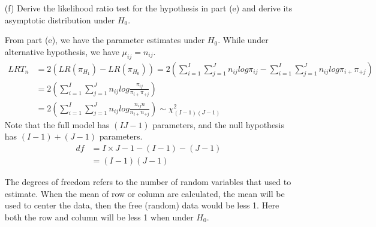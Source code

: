 \begin{itemize}
\item[(f)] Derive the likelihood ratio test for the hypothesis in part (e) and derive its asymptotic distribution under $H_0$.

From part (e), we have the parameter estimates under $H_0$. While under alternative hypothesis, we have $\mu_{ij} = n_{ij}$. 
\begin{align*}
	LRT_n &= 2(LR(\pi_{H_1}) - LR(\pi_{H_0})) =2\left( \sum_{i=1}^I \sum_{j=1}^J n_{ij} log \pi_{ij} - \sum_{i=1}^I \sum_{j=1}^J n_{ij} log \pi_{i+} \pi_{+j} \right)\\
	&= 2\left( \sum_{i=1}^I \sum_{j=1}^J n_{ij} log \frac{\pi_{ij}}{\pi_{i+} \pi_{+j} }   \right)\\
	&= 2\left( \sum_{i=1}^I \sum_{j=1}^J n_{ij} log \frac{n_{ij} n}{n_{i+} n_{+j} }   \right) \sim \chi^2_{(I-1)(J-1)} 
\end{align*}
Note that the full model has $(IJ-1)$ parameters, and the null hypothesis has $(I-1)+ (J-1)$ parameters.
\begin{align*}
	df &= I \times J-1 - (I-1) - (J-1)\\
	&= (I-1)(J-1)
\end{align*}

The degrees of freedom refers to the number of random variables that used to estimate. When the mean of row or column are calculated, the mean will be used to center the data, then the free (random) data would be less 1. Here both the row and column will be less 1 when under $H_0$.

\end{itemize}




